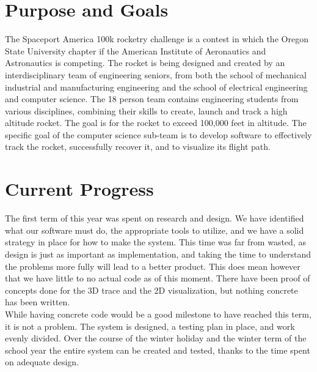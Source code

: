 \documentclass[onecolumn, draftclsnofoot,10pt, compsoc]{IEEEtran}
\begin{document}
\section {Purpose and Goals}
The Spaceport America 100k rocketry challenge is a contest in which the Oregon State University chapter if the American Institute of Aeronautics and Astronautics is competing. The rocket is being designed and created by an interdisciplinary team of engineering seniors, from both the school of mechanical industrial and manufacturing engineering and the school of electrical engineering and computer science. The 18 person team contains engineering students from various disciplines, combining their skills to create, launch and track a high altitude rocket. The goal is for the rocket to exceed 100,000 feet in altitude. The specific goal of the computer science sub-team is to develop software to effectively track the rocket, successfully recover it, and to visualize its flight path. \par
\section {Current Progress} 
The first term of this year was spent on research and design. We have identified what our software must do, the appropriate tools to utilize, and we have a solid strategy in place for how to make the system. This time was far from wasted, as design is just as important as implementation, and taking the time to understand the problems more fully will lead to a better product. This does mean however that we have little to no actual code as of this moment. There have been proof of concepts done for the 3D trace and the 2D visualization, but nothing concrete has been written. \\
While having concrete code would be a good milestone to have reached this term, it is not a problem. The system is designed, a testing plan in place, and work evenly divided. Over the course of the winter holiday and the winter term of the school year the entire system can be created and tested, thanks to the time spent on adequate design. \par
\end{document}
